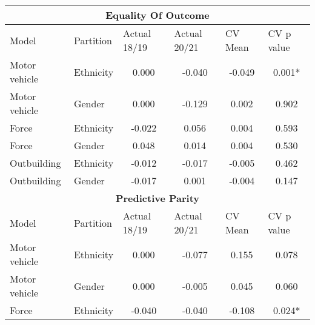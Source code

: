 
\begin{table}[]
\begin{tabular}{@{}llcccc@{}}
\toprule
\multicolumn{6}{c}{\textbf{Equality Of Outcome}}                                                                                                                  \\ \midrule
Model         & Partition & \multicolumn{1}{l}{Actual 18/19} & \multicolumn{1}{l}{Actual 20/21} & \multicolumn{1}{l}{CV Mean} & \multicolumn{1}{l}{CV p value} \\\midrule
Motor vehicle & Ethnicity & 0.000                            & -0.040                           & -0.049                   & 0.001*                      \\
Motor vehicle & Gender    & 0.000                            & -0.129                           & 0.002                    & 0.902                       \\
Force         & Ethnicity & -0.022                           & 0.056                            & 0.004                    & 0.593                       \\
Force         & Gender    & 0.048                            & 0.014                            & 0.004                    & 0.530                       \\
Outbuilding   & Ethnicity & -0.012                           & -0.017                           & -0.005                   & 0.462                       \\
Outbuilding   & Gender    & -0.017                           & 0.001                            & -0.004                   & 0.147                       \\\midrule
\multicolumn{6}{c}{\textbf{Predictive Parity} }                                                                                                                   \\
Model         & Partition & \multicolumn{1}{l}{Actual 18/19} & \multicolumn{1}{l}{Actual 20/21} & \multicolumn{1}{l}{CV Mean} & \multicolumn{1}{l}{CV p value} \\\midrule
Motor vehicle & Ethnicity & 0.000                            & -0.077                           & 0.155                    & 0.078                       \\
Motor vehicle & Gender    & 0.000                            & -0.005                           & 0.045                    & 0.060                       \\
Force         & Ethnicity & -0.040                           & -0.040                           & -0.108                   & 0.024*                      \\

\end{tabular}
\end{table}
